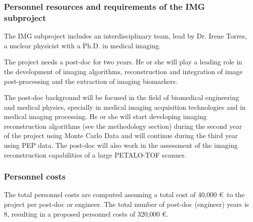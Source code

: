 \subsubsection*{Personnel resources and requirements of the IMG subproject}
 The IMG subproject includes an interdisciplinary team, lead by Dr. Irene Torres, a nuclear physicist with a Ph.D. in medical imaging.

 The project needs a post-doc for two years. He or she will play a leading role in the development of imaging algorithms, reconstruction and integration of image post-processing and the extraction of imaging biomarkers.

The post-doc background will be focused in the field of biomedical engineering and medical physics, specially in medical imaging acquisition technologies and in medical imaging processing. He or she will start developing imaging reconstruction algorithms (see the methodology section) during the second year of the project using Monte Carlo Data and will continue during the third year using PEP data. The post-doc will also work in the assessment of the imaging reconstruction capabilities of a large PETALO-TOF scanner.


\subsubsection*{Personnel costs}
The total personnel costs are computed assuming a total cost of 40,000 \euro\ to the project per post-doc or engineer. The total number of post-doc (engineer) years is 8, resulting in a proposed personnel costs of 320,000 \euro.
